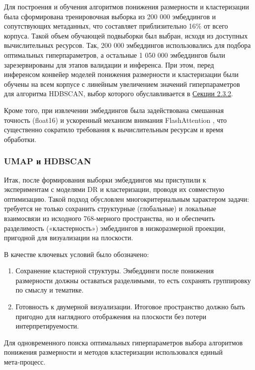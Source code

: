 Для построения и обучения алгоритмов понижения размерности и кластеризации была сформирована
тренировочная выборка из 200 000 эмбеддингов и сопутствующих метаданных, что составляет приблизительно
16\% от всего корпуса. Такой объем обучающей подвыборки был выбран, исходя из доступных вычислительных
ресурсов. Так, 200 000 эмбеддингов использовались для подбора оптимальных гиперпараметров,
а остальные 1 050 000 эмбеддингов были зарезервированы для этапов валидации и инференса.
При этом, перед инференсом конвейер моделей понижения размерности и кластеризации были обучены
на всем корпусе с линейным увеличением значений гиперпараметров для алгоритма HDBSCAN, выбор которого
обуславливается в \hyperref[sec:drc]{Секции 2.3.2}.

Кроме того, при извлечении эмбеддингов была задействована смешанная точность (float16) и ускоренный
механизм внимания FlashAttention \parencite{flash2022attention}, что существенно сократило требования
к вычислительным ресурсам и время обработки.

\subsubsection{UMAP и HDBSCAN}
\label{sec:drc}
Итак, после формирования выборки эмбеддингов мы приступили к экспериментам с моделями DR и кластеризации,
проводя их совместную оптимизацию. Такой подход обусловлен многокритериальным характером задачи: требуется
не только сохранить структурные (глобальные) и локальные взаимосвязи из исходного 768-мерного пространства,
но и обеспечить разделимость («кластерность») эмбеддингов в низкоразмерной проекции, пригодной для визуализации на плоскости.

В качестве ключевых условий было обозначено:

\begin{enumerate}
    \item Сохранение кластерной структуры. Эмбеддинги после понижения размерности должны оставаться разделимыми,
    то есть сохранять группировку по смыслу и тематике.
    \item Готовность к двумерной визуализации. Итоговое пространство должно быть пригодно для наглядного
    отображения на плоскости без потери интерпретируемости.
\end{enumerate}

Для одновременного поиска оптимальных гиперпараметров выбора алгоритмов понижения размерности
и методов кластеризации использовался единый мета‑процесс.

